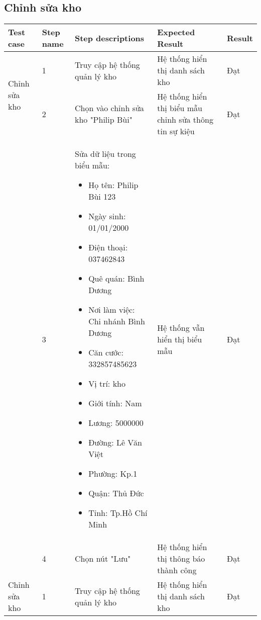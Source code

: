 \subsection{Chỉnh sửa kho}
{
    \setlength\extrarowheight{6pt}
    \begin{longtable}{| p{2.5cm}| p{1cm}| p{5.5cm}| p{4.5cm} | p{1.5cm} |}
        \hline
        \textbf{Test case} & \textbf{Step name} & \textbf{Step descriptions} & \textbf{Expected Result} & \textbf{Result} \\
        \hline
        \multirow[t]{2}{2.5cm}{Chỉnh sửa kho} & 1 & Truy cập hệ thống quản lý kho & Hệ thống hiển thị danh sách kho & Đạt \\
        \cline{2-5}
         & 2 & Chọn vào chỉnh sửa kho "Philip Bùi" & Hệ thống hiển thị biểu mẫu chỉnh sửa thông tin sự kiệu & Đạt \\
        \cline{2-5}
        & 3 & Sửa dữ liệu trong biểu mẫu:
        \begin{itemize}
            \item Họ tên: Philip Bùi 123
            \item Ngày sinh: 01/01/2000
            \item Điện thoại: 037462843
            \item Quê quán: Bình Dương
            \item Nơi làm việc: Chi nhánh Bình Dương
            \item Căn cước: 332857485623
            \item Vị trí: kho
            \item Giới tính: Nam
            \item Lương: 5000000
            \item Đường: Lê Văn Việt
            \item Phường: Kp.1
            \item Quận: Thủ Đức 
            \item Tỉnh: Tp.Hồ Chí Minh
        \end{itemize} & Hệ thống vẫn hiển thị biểu mẫu & Đạt \\
        \cline{2-5}
         & 4 & Chọn nút "Lưu" & Hệ thống hiển thị thông báo thành công & Đạt \\
        \hline
        \multirow[t]{2}{2.5cm}{Chỉnh sửa kho} & 1 & Truy cập hệ thống quản lý kho & Hệ thống hiển thị danh sách kho & Đạt \\

\end{longtable}}

